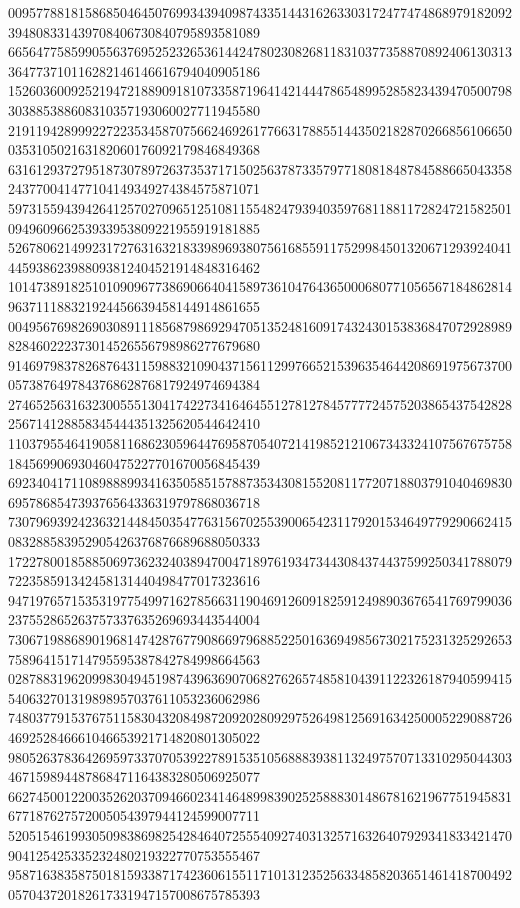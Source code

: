 \begin{DoxyCode}
      009577881815868504645076993439409874335144316263303172477474868979182092394808331439708406730840795893581089
      665647758599055637695252326536144247802308268118310377358870892406130313364773710116282146146616794040905186
      152603600925219472188909181073358719641421444786548995285823439470500798303885388608310357193060027711945580
      219119428999227223534587075662469261776631788551443502182870266856106650035310502163182060176092179846849368
      631612937279518730789726373537171502563787335797718081848784588665043358243770041477104149349274384575871071
      597315594394264125702709651251081155482479394035976811881172824721582501094960966253933953809221955919181885
      526780621499231727631632183398969380756168559117529984501320671293924041445938623988093812404521914848316462
      101473891825101090967738690664041589736104764365000680771056567184862814963711188321924456639458144914861655
      004956769826903089111856879869294705135248160917432430153836847072928989828460222373014526556798986277679680
      914697983782687643115988321090437156112997665215396354644208691975673700057387649784376862876817924974694384
      274652563163230055513041742273416464551278127845777724575203865437542828256714128858345444351325620544642410
      110379554641905811686230596447695870540721419852121067343324107567675758184569906930460475227701670056845439
      692340417110898889934163505851578873534308155208117720718803791040469830695786854739376564336319797868036718
      730796939242363214484503547763156702553900654231179201534649779290662415083288583952905426376876689688050333
      172278001858850697362324038947004718976193473443084374437599250341788079722358591342458131440498477017323616
      947197657153531977549971627856631190469126091825912498903676541769799036237552865263757337635269693443544004
      730671988689019681474287677908669796885225016369498567302175231325292653758964151714795595387842784998664563
      028788319620998304945198743963690706827626574858104391122326187940599415540632701319898957037611053236062986
      748037791537675115830432084987209202809297526498125691634250005229088726469252846661046653921714820801305022
      980526378364269597337070539227891535105688839381132497570713310295044303467159894487868471164383280506925077
      662745001220035262037094660234146489983902525888301486781621967751945831677187627572005054397944124599007711
      520515461993050983869825428464072555409274031325716326407929341833421470904125425335232480219322770753555467
      958716383587501815933871742360615511710131235256334858203651461418700492057043720182617331947157008675785393

\end{DoxyCode}
